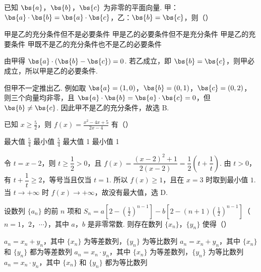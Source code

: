 \begin{problem}
已知 \(\bs{a}\)，\(\bs{b}\)，\(\bs{c}\) 为非零的平面向量. 甲：\(\bs{a}\cdot\bs{b}=\bs{a}\cdot\bs{c}\)，乙：\(\bs{b}=\bs{c}\)，则（\quad）

\choices
    {甲是乙的充分条件但不是必要条件}
    {甲是乙的必要条件但不是充分条件}
    {甲是乙的充要条件}
    {甲既不是乙的充分条件也不是乙的必要条件}
\end{problem}

\begin{solution}
由甲得 \(\bs{a}\cdot(\bs{b}-\bs{c})=0\). 若乙成立，即 \(\bs{b}=\bs{c}\)，则甲必成立，所以甲是乙的必要条件.

但甲不一定推出乙. 例如取 \(\bs{a}=\left(1,0\right)\)，\(\bs{b}=\left(0,1\right)\)，\(\bs{c}=\left(0,2\right)\)，则三个向量均非零，且 \(\bs{a}\cdot\bs{b}=\bs{a}\cdot\bs{c}=0\)，但 \(\bs{b}\neq\bs{c}\). 因此甲不是乙的充分条件，故选 B.
\end{solution}

\begin{problem}
已知 \(x\geqslant \frac{5}{2}\)，则 \(f(x)=\frac{x^2-4x+5}{2x-4}\) 有（\quad）

\choices
    {最大值 \(\frac{5}{4}\)}
    {最小值 \(\frac{5}{4}\)}
    {最大值 1}
    {最小值 1}
\end{problem}

\begin{solution}
令 \(t=x-2\)，则 \(t\geqslant\dfrac{1}{2}>0\)，且
\(f(x)=\dfrac{\left(x-2\right)^2+1}{2\left(x-2\right)}=\dfrac{1}{2}\left(t+\dfrac{1}{t}\right)\).
由 \(t>0\)，有 \(t+\dfrac{1}{t}\geqslant2\)，等号当且仅当 \(t=1\). 所以 \(f(x)\geqslant1\)，且在 \(x=3\) 时取到最小值 \(1\). 当 \(t\to+\infty\) 时 \(f(x)\to+\infty\)，故没有最大值，选 D.
\end{solution}

\begin{problem}
设数列 \(\{a_n\}\) 的前 \(n\) 项和 \(S_n=a\left[2-\left(\frac{1}{2}\right)^{n-1}\right]-b\left[2-\left(n+1\right)\left(\frac{1}{2}\right)^{n-1}\right]\)（\(n=1\)，\(2\)，\(\cdots\)），其中 \(a\)，\(b\) 是非零常数. 则存在数列 \(\{x_n\}\)，\(\{y_n\}\) 使得（\quad）

\choices
    {\(a_n=x_n+y_n\)，其中 \(\{x_n\}\) 为等差数列，\(\{y_n\}\) 为等比数列}
    {\(a_n=x_n+y_n\)，其中 \(\{x_n\}\) 和 \(\{y_n\}\) 都为等差数列}
    {\(a_n=x_n\cdot y_n\)，其中 \(\{x_n\}\) 为等差数列，\(\{y_n\}\) 为等比数列}
    {\(a_n=x_n\cdot y_n\)，其中 \(\{x_n\}\) 和 \(\{y_n\}\) 都为等比数列}
\end{problem}

